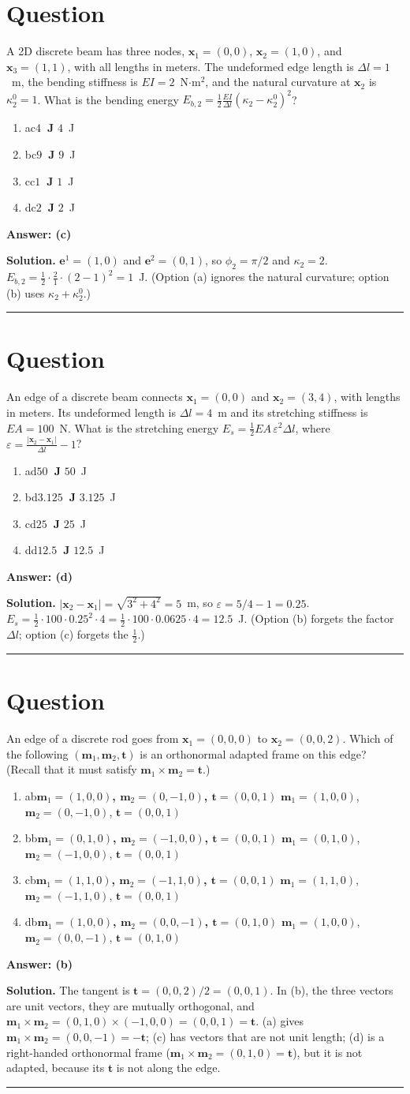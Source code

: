 \documentclass[letterpaper,11pt]{article}
\newcounter{qnum}
\newcommand{\opt}[3]{\item \if#1#2{\boldmath\textbf{#3}} \quad \textcolor{OliveGreen}{\checkmark}\else #3\fi}
\newcommand{\sol}[7]{%
  \stepcounter{qnum}%
  \section*{Question \theqnum}
  #1
  \begin{enumerate}[label=(\alph*)]
    \opt{a}{#6}{#2}
    \opt{b}{#6}{#3}
    \opt{c}{#6}{#4}
    \opt{d}{#6}{#5}
  \end{enumerate}
  \vspace{1mm}
  \textbf{Answer: (#6)}

  \textbf{Solution.} #7

  \vspace{2mm}\hrule
}
\begin{document}
%
%
\sol{A 2D discrete beam has three nodes, $\mathbf{x}_1 = (0, 0)$, $\mathbf{x}_2 = (1, 0)$, and $\mathbf{x}_3 = (1, 1)$, with all lengths in meters. The undeformed edge length is $\Delta l = 1$~m, the bending stiffness is $EI = 2$~N$\cdot$m$^2$, and the natural curvature at $\mathbf{x}_2$ is $\kappa^0_2 = 1$. What is the bending energy $E_{b,2} = \frac{1}{2} \frac{EI}{\Delta l} (\kappa_2 - \kappa^0_2)^2$?}
  {$4$~J}
  {$9$~J}
  {$1$~J}
  {$2$~J}
  {c}
  {$\mathbf{e}^1 = (1, 0)$ and $\mathbf{e}^2 = (0, 1)$, so $\phi_2 = \pi/2$ and $\kappa_2 = 2$.
$E_{b,2} = \frac{1}{2} \cdot \frac{2}{1} \cdot (2 - 1)^2 = 1$~J. (Option (a) ignores the natural curvature; option (b) uses $\kappa_2 + \kappa^0_2$.)}

%
%
\sol{An edge of a discrete beam connects $\mathbf{x}_1 = (0, 0)$ and $\mathbf{x}_2 = (3, 4)$, with lengths in meters. Its undeformed length is $\Delta l = 4$~m and its stretching stiffness is $EA = 100$~N. What is the stretching energy $E_s = \frac{1}{2} EA \, \varepsilon^2 \Delta l$, where $\varepsilon = \frac{|\mathbf{x}_2 - \mathbf{x}_1|}{\Delta l} - 1$?}
  {$50$~J}
  {$3.125$~J}
  {$25$~J}
  {$12.5$~J}
  {d}
  {$|\mathbf{x}_2 - \mathbf{x}_1| = \sqrt{3^2 + 4^2} = 5$~m, so $\varepsilon = 5/4 - 1 = 0.25$.
$E_s = \frac{1}{2} \cdot 100 \cdot 0.25^2 \cdot 4 = \frac{1}{2} \cdot 100 \cdot 0.0625 \cdot 4 = 12.5$~J. (Option (b) forgets the factor $\Delta l$; option (c) forgets the $\frac{1}{2}$.)}

%
%
\sol{An edge of a discrete rod goes from $\mathbf{x}_1 = (0, 0, 0)$ to $\mathbf{x}_2 = (0, 0, 2)$. Which of the following $(\mathbf{m}_1, \mathbf{m}_2, \mathbf{t})$ is an orthonormal adapted frame on this edge? (Recall that it must satisfy $\mathbf{m}_1 \times \mathbf{m}_2 = \mathbf{t}$.)}
  {$\mathbf{m}_1 = (1, 0, 0)$, $\mathbf{m}_2 = (0, -1, 0)$, $\mathbf{t} = (0, 0, 1)$}
  {$\mathbf{m}_1 = (0, 1, 0)$, $\mathbf{m}_2 = (-1, 0, 0)$, $\mathbf{t} = (0, 0, 1)$}
  {$\mathbf{m}_1 = (1, 1, 0)$, $\mathbf{m}_2 = (-1, 1, 0)$, $\mathbf{t} = (0, 0, 1)$}
  {$\mathbf{m}_1 = (1, 0, 0)$, $\mathbf{m}_2 = (0, 0, -1)$, $\mathbf{t} = (0, 1, 0)$}
  {b}
  {The tangent is $\mathbf{t} = (0, 0, 2)/2 = (0, 0, 1)$. In (b), the three vectors are unit vectors, they are mutually orthogonal, and $\mathbf{m}_1 \times \mathbf{m}_2 = (0, 1, 0) \times (-1, 0, 0) = (0, 0, 1) = \mathbf{t}$.
(a) gives $\mathbf{m}_1 \times \mathbf{m}_2 = (0, 0, -1) = -\mathbf{t}$; (c) has vectors that are not unit length; (d) is a right-handed orthonormal frame ($\mathbf{m}_1 \times \mathbf{m}_2 = (0, 1, 0) = \mathbf{t}$), but it is not adapted, because its $\mathbf{t}$ is not along the edge.}
\end{document}
